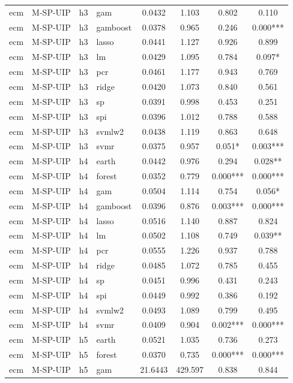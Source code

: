 \begin{ThreePartTable}
\begin{longtable}[t]{llclcccc}
ecm & M-SP-UIP & h3 & gam & 0.0432 & 1.103 & 0.802 & 0.110\\
ecm & M-SP-UIP & h3 & gamboost & 0.0378 & 0.965 & 0.246 & 0.000***\\
ecm & M-SP-UIP & h3 & lasso & 0.0441 & 1.127 & 0.926 & 0.899\\
ecm & M-SP-UIP & h3 & lm & 0.0429 & 1.095 & 0.784 & 0.097*\\
ecm & M-SP-UIP & h3 & pcr & 0.0461 & 1.177 & 0.943 & 0.769\\
ecm & M-SP-UIP & h3 & ridge & 0.0420 & 1.073 & 0.840 & 0.561\\
ecm & M-SP-UIP & h3 & sp & 0.0391 & 0.998 & 0.453 & 0.251\\
ecm & M-SP-UIP & h3 & spi & 0.0396 & 1.012 & 0.788 & 0.588\\
ecm & M-SP-UIP & h3 & svmlw2 & 0.0438 & 1.119 & 0.863 & 0.648\\
ecm & M-SP-UIP & h3 & svmr & 0.0375 & 0.957 & 0.051* & 0.003***\\
\addlinespace
ecm & M-SP-UIP & h4 & earth & 0.0442 & 0.976 & 0.294 & 0.028**\\
ecm & M-SP-UIP & h4 & forest & 0.0352 & 0.779 & 0.000*** & 0.000***\\
ecm & M-SP-UIP & h4 & gam & 0.0504 & 1.114 & 0.754 & 0.056*\\
ecm & M-SP-UIP & h4 & gamboost & 0.0396 & 0.876 & 0.003*** & 0.000***\\
ecm & M-SP-UIP & h4 & lasso & 0.0516 & 1.140 & 0.887 & 0.824\\
ecm & M-SP-UIP & h4 & lm & 0.0502 & 1.108 & 0.749 & 0.039**\\
ecm & M-SP-UIP & h4 & pcr & 0.0555 & 1.226 & 0.937 & 0.788\\
ecm & M-SP-UIP & h4 & ridge & 0.0485 & 1.072 & 0.785 & 0.455\\
ecm & M-SP-UIP & h4 & sp & 0.0451 & 0.996 & 0.431 & 0.243\\
ecm & M-SP-UIP & h4 & spi & 0.0449 & 0.992 & 0.386 & 0.192\\
ecm & M-SP-UIP & h4 & svmlw2 & 0.0493 & 1.089 & 0.799 & 0.495\\
ecm & M-SP-UIP & h4 & svmr & 0.0409 & 0.904 & 0.002*** & 0.000***\\
\addlinespace
ecm & M-SP-UIP & h5 & earth & 0.0521 & 1.035 & 0.736 & 0.273\\
ecm & M-SP-UIP & h5 & forest & 0.0370 & 0.735 & 0.000*** & 0.000***\\
ecm & M-SP-UIP & h5 & gam & 21.6443 & 429.597 & 0.838 & 0.844\\

\end{longtable}
\end{ThreePartTable}
